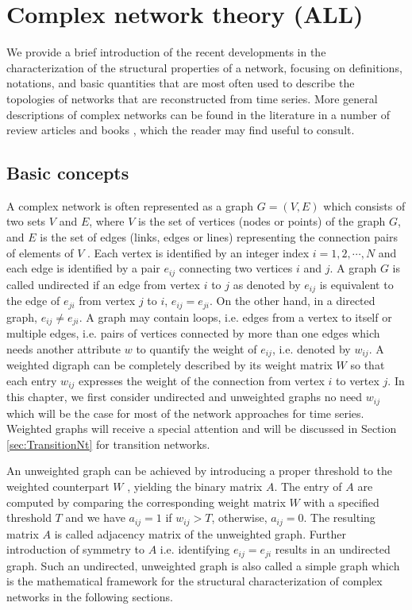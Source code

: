 \section{Complex network theory {\bf{(ALL)}}} \label{sec:CompNetworkT}
We provide a brief introduction of the recent developments in the characterization of the structural properties of a network, focusing on definitions, notations, and basic quantities that are most often used to describe the topologies of networks that are reconstructed from time series. More general descriptions of complex networks can be found in the literature in a number of review articles \cite{Albert2002,Newman2003,Boccaletti2006,Costa2007} and books \cite{Cohenbook2010,Newmanbook2010}, which the reader may find useful to consult.  
	
	\subsection{Basic concepts} 
	A complex network is often represented as a graph $G = (V, E)$ which consists of two sets $V$ and $E$, where $V$ is the set of vertices (nodes or points) of the graph $G$, and $E$ is the set of edges (links, edges or lines) representing the connection pairs of elements of $V$ \cite{Costa2007}. Each vertex is identified by an integer index $i = 1, 2, \cdots, N$ and each edge is identified by a pair $e_{ij}$ connecting two vertices $i$ and $j$. A graph $G$ is called undirected if an edge from vertex $i$ to $j$ as denoted by $e_{ij}$ is equivalent to the edge of $e_{ji}$ from vertex $j$ to $i$, $e_{ij} = e_{ji}$. On the other hand, in a directed graph, $e_{ij} \neq e_{ji}$. A graph may contain loops, i.e. edges from a vertex to itself or multiple edges, i.e. pairs of vertices connected by more than one edges which needs another attribute $w$ to quantify the weight of $e_{ij}$, i.e. denoted by $w_{ij}$. A weighted digraph can be completely described by its weight matrix $W$ so that each entry $w_{ij}$ expresses the weight of the connection from vertex $i$ to vertex $j$. In this chapter, we first consider undirected and unweighted graphs no need $w_{ij}$ which will be the case for most of the network approaches for time series.  Weighted graphs will receive a special attention and will be discussed in Section \ref{sec:TransitionNt} for transition networks. 
	
	An unweighted graph can be achieved by introducing a proper threshold to the weighted counterpart $W$ \cite{Costa2007}, yielding the binary matrix $A$. The entry of $A$ are computed by comparing the corresponding weight matrix $W$ with a specified threshold $T$ and we have $a_{ij} = 1$ if $w_{ij} > T$, otherwise, $a_{ij} = 0$. The resulting matrix $A$ is called adjacency matrix of the unweighted graph. Further introduction of symmetry to $A$ i.e. identifying $e_{ij} = e_{ji}$ results in an undirected graph. Such an undirected, unweighted graph is also called a simple graph which is the  mathematical framework for the structural characterization of complex networks in the following sections. 
	
